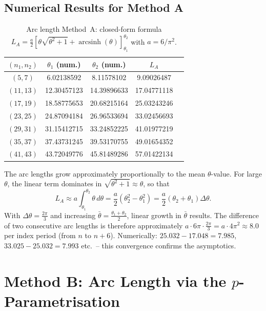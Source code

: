 \subsection{Numerical Results for Method A}

\begin{table}[H]
\centering
\caption{Arc length Method~A: closed-form formula
  $L_A = \frac{a}{2}[\theta\sqrt{\theta^2+1}+\operatorname{arcsinh}(\theta)]_{\theta_1}^{\theta_2}$
  with $a = 6/\pi^2$.}
\renewcommand{\arraystretch}{1.2}
\begin{tabular}{ccccc}
\toprule
$(n_1, n_2)$ & $\theta_1$ (num.) & $\theta_2$ (num.) & $L_A$ \\
\midrule
$( 5,  7)$ & 6.02138592 &  8.11578102 &  9.09026487 \\
$(11, 13)$ & 12.30457123 & 14.39896633 & 17.04771118 \\
$(17, 19)$ & 18.58775653 & 20.68215164 & 25.03243246 \\
$(23, 25)$ & 24.87094184 & 26.96533694 & 33.02456693 \\
$(29, 31)$ & 31.15412715 & 33.24852225 & 41.01977219 \\
$(35, 37)$ & 37.43731245 & 39.53170755 & 49.01654352 \\
$(41, 43)$ & 43.72049776 & 45.81489286 & 57.01422134 \\
\bottomrule
\end{tabular}
\end{table}

\begin{bemerkung}
The arc lengths grow approximately proportionally to the mean $\theta$-value.
For large $\theta$, the linear term dominates in $\sqrt{\theta^2+1} \approx \theta$, so that
\[
  L_A \approx a\int_{\theta_1}^{\theta_2}\theta\,d\theta
  = \frac{a}{2}(\theta_2^2 - \theta_1^2)
  = \frac{a}{2}(\theta_2+\theta_1)\Delta\theta.
\]
With $\Delta\theta = \frac{2\pi}{3}$ and increasing $\bar\theta = \frac{\theta_1+\theta_2}{2}$,
linear growth in $\bar\theta$ results. The difference of two
consecutive arc lengths is therefore approximately
$a \cdot 6\pi \cdot \frac{2\pi}{3} = a \cdot 4\pi^2 \approx 8.0$ per
index period (from $n$ to $n+6$). Numerically: $25.032 - 17.048 = 7.985$,
$33.025 - 25.032 = 7.993$ etc.\ -- this convergence confirms the asymptotics.
\end{bemerkung}


\section{Method B: Arc Length via the $p$-Parametrisation}
\label{sec:methode_B}


